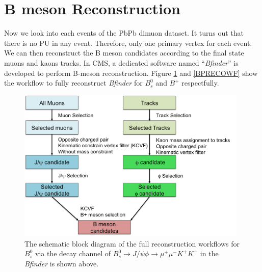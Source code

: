 
\section{B meson Reconstruction} 

Now we look into each events of the PbPb dimuon dataset. It turns out that there is no PU in any event. Therefore, only one primary vertex for each event. We can then reconstruct the B meson candidates according to the final state muons and kaons tracks. In CMS, a dedicated software named ``\textit{Bfinder}'' is developed to perform B-meson reconstruction. Figure \ref{BsRECOWF} and \ref{BPRECOWF} show the workflow to fully reconstruct \textit{Bfinder} for $B^0_s$ and $B^+$ respectfully.


\begin{figure}[h]
\begin{center}
\includegraphics[width= 0.98\textwidth]{Figures/Chapter5/BsmesonWorkflow.png}
\caption{The schematic block diagram of the full reconstruction workflows for $B^0_s$ via the decay channel of $B_s^0 \rightarrow J/\psi \phi \rightarrow \mu^+\mu^- K^+K^-$ in the \textit{Bfinder} is shown above.}
\label{BsRECOWF}
\end{center}
\end{figure}

